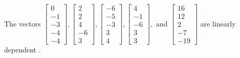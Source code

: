 \begin{exercise}
\begin{exerciseStatement}
  \end{exerciseStatement}
  \begin{exerciseAnswer}
   The vectors \(\left[\begin{array}{r}
0 \\
-1 \\
-3 \\
-4 \\
-4
\end{array}\right] , \left[\begin{array}{r}
2 \\
2 \\
4 \\
-6 \\
3
\end{array}\right] , \left[\begin{array}{r}
-6 \\
-5 \\
-3 \\
3 \\
4
\end{array}\right] , \left[\begin{array}{r}
4 \\
-1 \\
-6 \\
3 \\
3
\end{array}\right] , \text{ and } \left[\begin{array}{r}
16 \\
12 \\
2 \\
-7 \\
-19
\end{array}\right]\) are 
  	 linearly dependent  .
  


  \end{exerciseAnswer}
\end{exercise}